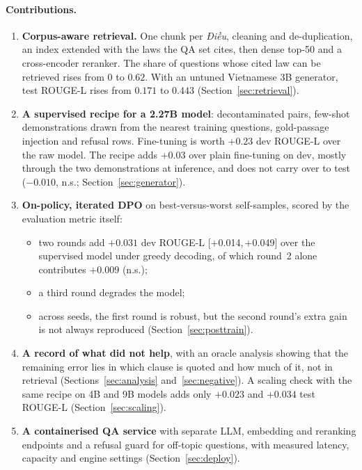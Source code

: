 \documentclass[11pt,a4paper]{article}
\newcommand{\rl}{ROUGE-L}
\newcommand{\dieu}{\textit{Điều}}
\newcommand{\ci}[2]{{\scriptsize[#1,\,#2]}}
\begin{document}
\paragraph{Contributions.}
\begin{enumerate}[leftmargin=*]
\item \textbf{Corpus-aware retrieval.} One chunk per \dieu, cleaning and de-duplication, an index extended with the laws the QA set cites, then dense top-50 and a cross-encoder reranker. The share of questions whose cited law can be retrieved rises from $0$ to $0.62$. With an untuned Vietnamese 3B generator, test \rl{} rises from $0.171$ to $0.443$ (Section~\ref{sec:retrieval}).
\item \textbf{A supervised recipe for a 2.27B model}: decontaminated pairs, few-shot demonstrations drawn from the nearest training questions, gold-passage injection and refusal rows. Fine-tuning is worth $+0.23$ dev \rl{} over the raw model. The recipe adds $+0.03$ over plain fine-tuning on dev, mostly through the two demonstrations at inference, and does not carry over to test ($-0.010$, n.s.; Section~\ref{sec:generator}).
\item \textbf{On-policy, iterated DPO} on best-versus-worst self-samples, scored by the evaluation metric itself:
  \begin{itemize}[leftmargin=*]
  \item two rounds add $+0.031$ dev \rl{} \ci{+0.014}{+0.049} over the supervised model under greedy decoding, of which round~2 alone contributes $+0.009$ (n.s.);
  \item a third round degrades the model;
  \item across seeds, the first round is robust, but the second round's extra gain is not always reproduced (Section~\ref{sec:posttrain}).
  \end{itemize}
\item \textbf{A record of what did not help}, with an oracle analysis showing that the remaining error lies in which clause is quoted and how much of it, not in retrieval (Sections~\ref{sec:analysis} and~\ref{sec:negative}). A scaling check with the same recipe on 4B and 9B models adds only $+0.023$ and $+0.034$ test \rl{} (Section~\ref{sec:scaling}).
\item \textbf{A containerised QA service} with separate LLM, embedding and reranking endpoints and a refusal guard for off-topic questions, with measured latency, capacity and engine settings (Section~\ref{sec:deploy}).
\end{enumerate}
\end{document}
